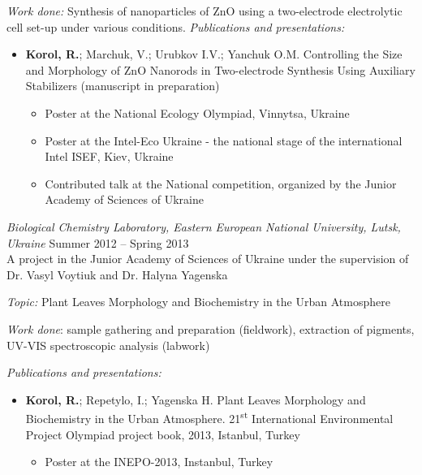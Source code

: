 \documentclass[9pt, margin]{res}
\begin{document}
\begin{resume}
\textit{Work done:} Synthesis of nanoparticles of ZnO using a two-electrode electrolytic cell set-up under various conditions.  
\textit{Publications and presentations:}
\begin{itemize}
	\item \textbf{Korol, R.}; Marchuk, V.; Urubkov I.V.; Yanchuk O.M. Controlling the Size and Morphology of ZnO Nanorods in Two-electrode Synthesis Using Auxiliary Stabilizers
	(manuscript in preparation)
	\begin{itemize}
		\item Poster at the National Ecology Olympiad, Vinnytsa, Ukraine
		\item Poster at the Intel-Eco Ukraine - the national stage of the international Intel ISEF, Kiev, Ukraine
		\item Contributed talk at the National competition, organized by the Junior Academy of Sciences of Ukraine
		\newline\newline
	\end{itemize}
\end{itemize}
{\sl Biological Chemistry Laboratory, Eastern European National University, Lutsk, Ukraine} 
\newline \hfill Summer 2012 -- Spring 2013 \\
A project in the Junior Academy of Sciences of Ukraine under the supervision of Dr. Vasyl Voytiuk and Dr. Halyna Yagenska

\textit{Topic:} Plant Leaves Morphology and Biochemistry in the Urban Atmosphere

\textit{Work done}: sample gathering and preparation (fieldwork), extraction of pigments, UV-VIS spectroscopic analysis (labwork)
  
\textit{Publications and presentations:}
\begin{itemize}
	\item \textbf{Korol, R.}; Repetylo, I.; Yagenska H. Plant Leaves Morphology and Biochemistry in the Urban Atmosphere. 21\textsuperscript{st} International Environmental Project Olympiad project book, 2013, Istanbul, Turkey
	\begin{itemize}
		\item Poster at the INEPO-2013, Instanbul, Turkey
	\end{itemize}
\end{itemize}

\end{resume}
\end{document}
